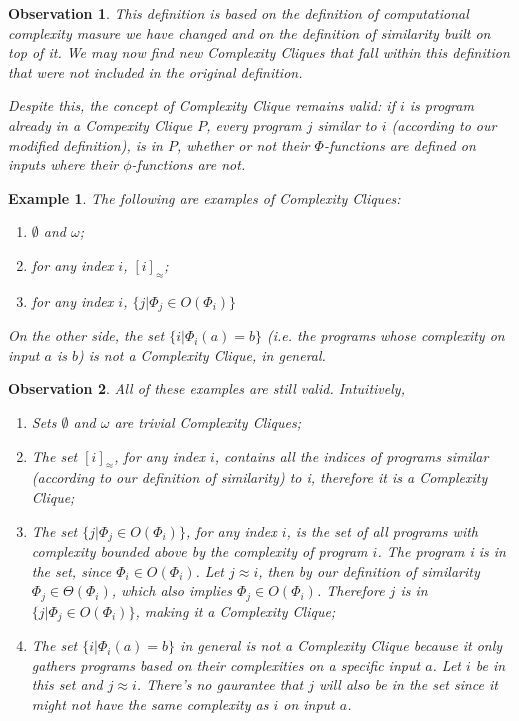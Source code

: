 \documentclass[10pt, a4paper, oneside, titlepage, draft]{article}
\newtheorem{observation}{Observation}[shrd]
\newtheorem{example}[shrd]{Example}
\begin{document}
\begin{observation}
    This definition is based on the definition of computational complexity masure we have changed and on the definition of similarity built on top of it. We may now find new Complexity Cliques that fall within this definition that were not included in the original definition.
    
    Despite this, the concept of Complexity Clique remains valid: if $i$ is program already in a Compexity Clique $P$, every program $j$ similar to $i$ (according to our modified definition), is in $P$, whether or not their $\Phi$-functions are defined on inputs where their $\phi$-functions are not.
\end{observation}

\begin{example}
    The following are examples of Complexity Cliques:
    \begin{enumerate}
        \item $\emptyset$ and $\omega$;
        \item for any index $i$, $[i]_{\approx}$;
        \item for any index $i$, $\{ j | \Phi_j \in O(\Phi_i) \}$ 
    \end{enumerate}
    On the other side, the set $ \{ i | \Phi_i(a) = b \} $ (i.e. the programs whose complexity on input $a$ is $b$) is not a Complexity Clique, in general.
\end{example}

\begin{observation}
    All of these examples are still valid. Intuitively,
    \begin{enumerate}
        \item Sets $\emptyset$ and $\omega$ are trivial Complexity Cliques;
        \item The set $[i]_{\approx}$, for any index $i$, contains all the indices of programs similar (according to our definition of similarity) to i, therefore it is a Complexity Clique; 
        \item The set $\{j|\Phi_j \in O(\Phi_i)\}$, for any index $i$, is the set of all programs with complexity bounded above by the complexity of program $i$. The program i is in the set, since $\Phi_i \in O(\Phi_i)$. Let $j \approx i$, then by our definition of similarity $\Phi_j \in \Theta(\Phi_i)$, which also implies $\Phi_j \in O(\Phi_i)$. Therefore $j$ is in $\{j|\Phi_j \in O(\Phi_i)\}$, making it a Complexity Clique;
        \item The set $\{i | \Phi_i(a) = b\}$ in general is not a Complexity Clique because it only gathers programs based on their complexities on a specific input $a$. Let $i$ be in this set and $j \approx i$. There's no gaurantee that $j$ will also be in the set since it might not have the same complexity as $i$ on input $a$.
    \end{enumerate}
     
\end{observation}
\end{document}
